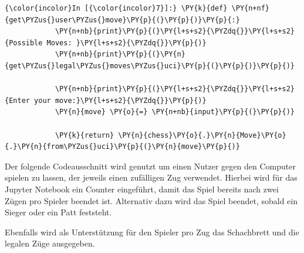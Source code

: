     \begin{Verbatim}[commandchars=\\\{\}]
{\color{incolor}In [{\color{incolor}7}]:} \PY{k}{def} \PY{n+nf}{get\PYZus{}user\PYZus{}move}\PY{p}{(}\PY{p}{)}\PY{p}{:}
            \PY{n+nb}{print}\PY{p}{(}\PY{l+s+s2}{\PYZdq{}}\PY{l+s+s2}{Possible Moves: }\PY{l+s+s2}{\PYZdq{}}\PY{p}{)}
            \PY{n+nb}{print}\PY{p}{(}\PY{n}{get\PYZus{}legal\PYZus{}moves\PYZus{}uci}\PY{p}{(}\PY{p}{)}\PY{p}{)}
            
            \PY{n+nb}{print}\PY{p}{(}\PY{l+s+s2}{\PYZdq{}}\PY{l+s+s2}{Enter your move:}\PY{l+s+s2}{\PYZdq{}}\PY{p}{)}
            \PY{n}{move} \PY{o}{=} \PY{n+nb}{input}\PY{p}{(}\PY{p}{)}
                
            \PY{k}{return} \PY{n}{chess}\PY{o}{.}\PY{n}{Move}\PY{o}{.}\PY{n}{from\PYZus{}uci}\PY{p}{(}\PY{n}{move}\PY{p}{)}
\end{Verbatim}


    Der folgende Codeausschnitt wird genutzt um einen Nutzer gegen den
Computer spielen zu lassen, der jeweils einen zufälligen Zug verwendet.
Hierbei wird für das Jupyter Notebook ein Counter eingeführt, damit das
Spiel bereits nach zwei Zügen pro Spieler beendet ist. Alternativ dazu
wird das Spiel beendet, sobald ein Sieger oder ein Patt feststeht.

Ebenfalls wird als Unterstützung für den Spieler pro Zug das Schachbrett
und die legalen Züge ausgegeben.

